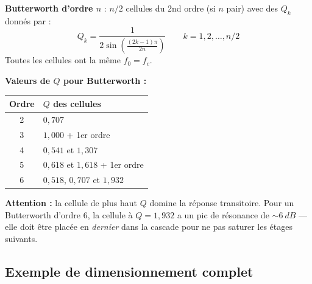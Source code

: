 \documentclass[12pt,a4paper,twoside]{book}
\begin{document}
\begin{formule}
\textbf{Butterworth d'ordre $n$} : $n/2$ cellules du 2nd ordre (si $n$ pair) avec des $Q_k$ donnés par :
\[
Q_k = \frac{1}{2\sin\left(\frac{(2k-1)\pi}{2n}\right)} \qquad k = 1, 2, \ldots, n/2
\]
Toutes les cellules ont la même $f_0 = f_c$.
\end{formule}

\begin{pratique}
\textbf{Valeurs de $Q$ pour Butterworth :}
\begin{center}
\begin{tabular}{cl}
\toprule
\textbf{Ordre} & \textbf{$Q$ des cellules} \\
\midrule
2 & $0{,}707$ \\
3 & $1{,}000$ + 1er ordre \\
4 & $0{,}541$ et $1{,}307$ \\
5 & $0{,}618$ et $1{,}618$ + 1er ordre \\
6 & $0{,}518$, $0{,}707$ et $1{,}932$ \\
\bottomrule
\end{tabular}
\end{center}
\textbf{Attention :} la cellule de plus haut $Q$ domine la réponse transitoire. Pour un Butterworth d'ordre 6, la cellule à $Q = 1{,}932$ a un pic de résonance de $\sim\SI{6}{dB}$ --- elle doit être placée en \textit{dernier} dans la cascade pour ne pas saturer les étages suivants.
\end{pratique}

\subsection{Exemple de dimensionnement complet}
\end{document}
